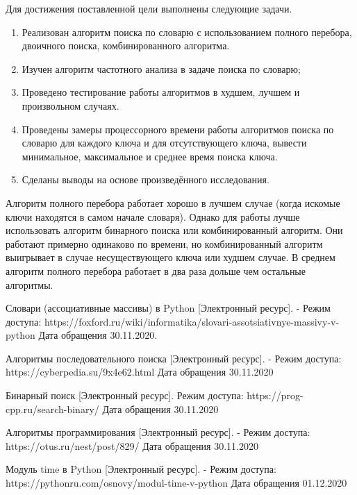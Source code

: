 \documentclass[12pt]{report}
\begin{document}
Для достижения поставленной цели выполнены следующие задачи.
\begin{enumerate}
	\item Реализован алгоритм поиска по словарю с использованием полного перебора, двоичного поиска, комбинированного алгоритма.
	
	\item Изучен алгоритм частотного анализа в задаче поиска по словарю;
	
	\item Проведено тестирование работы алгоритмов в худшем, лучшем и произвольном случаях.
	
	\item Проведены замеры процессорного времени работы алгоритмов поиска по словарю для каждого ключа и для отсутствующего ключа, вывести минимальное, максимальное и среднее время поиска ключа.
	
	\item Сделаны выводы на основе произведённого исследования.

\end{enumerate}

Алгоритм полного перебора работает хорошо в лучшем случае (когда искомые ключи находятся в самом начале словаря). Однако для работы лучше использовать алгоритм бинарного поиска или комбинированный алгоритм. Они работают примерно одинаково по времени, но комбинированный алгоритм выигрывает в случае несуществующего ключа или худшем случае. В среднем алгоритм полного перебора работает в два раза дольше чем остальные алгоритмы.




\begin{thebibliography}{9}
	 Словари (ассоциативные массивы) в Python [Электронный ресурс]. - Режим доступа: https://foxford.ru/wiki/informatika/slovari-assotsiativnye-massivy-v-python Дата обращения 30.11.2020.
	
	 Алгоритмы последовательного поиска [Электронный ресурс]. - Режим доступа: https://cyberpedia.su/9x4e62.html Дата обращения 30.11.2020
	
	Бинарный поиск [Электронный ресурс]. Режим доступа: https://prog-cpp.ru/search-binary/ Дата обращения 30.11.2020
	
	 Алгоритмы программирования [Электронный ресурс]. - Режим доступа: https://otus.ru/nest/post/829/ Дата обращения 30.11.2020
	
	 Модуль time в Python [Электронный ресурс]. - Режим доступа: https://pythonru.com/osnovy/modul-time-v-python Дата обращения 01.12.2020
	
\end{thebibliography}
\end{document}
